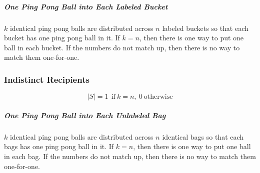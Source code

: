 \subparagraph{One Ping Pong Ball into Each Labeled Bucket} $k$ identical ping pong balls are distributed across $n$ labeled buckets so that each bucket has one ping pong ball in it. If $k=n$, then there is one way to put one ball in each bucket. If the numbers do not match up, then there is no way to match them one-for-one.

\subsubsection{Indistinct Recipients}

\begin{equation}
|S| = 1\ \ \mathrm{if\ }k = n,\ 0\ \mathrm{otherwise}
\end{equation}  

\subparagraph{One Ping Pong Ball into Each Unlabeled Bag} $k$ identical ping pong balls are distributed across $n$ identical bags so that each bags has one ping pong ball in it. If $k=n$, then there is one way to put one ball in each bag. If the numbers do not match up, then there is no way to match them one-for-one.









